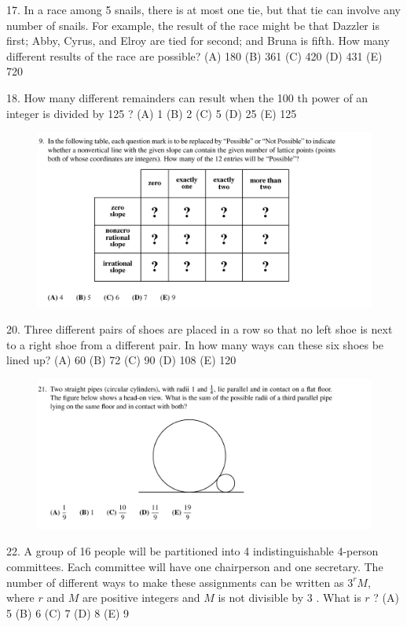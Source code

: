 \documentclass[12pt,a4paper]{book}
\theoremstyle{definition}
\begin{document}
17. In a race among 5 snails, there is at most one tie, but that tie can involve any number of snails. For example, the result of the race might be that Dazzler is first; Abby, Cyrus, and Elroy are tied for second; and Bruna is fifth. How many different results of the race are possible?
(A) 180
(B) 361
(C) 420
(D) 431
(E) 720

18. How many different remainders can result when the 100 th power of an integer is divided by 125 ?
(A) 1
(B) 2
(C) 5
(D) 25
(E) 125
\begin{figure}[H]
    \includegraphics[height=0.3\textheight]{19.png}
\end{figure}
20. Three different pairs of shoes are placed in a row so that no left shoe is next to a right shoe from a different pair. In how many ways can these six shoes be lined up?
(A) 60
(B) 72
(C) 90
(D) 108
(E) 120
\begin{figure}[H]
    \includegraphics[height=0.3\textheight]{21.png}
\end{figure}

22. A group of 16 people will be partitioned into 4 indistinguishable 4-person committees. Each committee will have one chairperson and one secretary. The number of different ways to make these assignments can be written as $3^r M$, where $r$ and $M$ are positive integers and $M$ is not divisible by 3 . What is $r$ ?
(A) 5
(B) 6
(C) 7
(D) 8
(E) 9
\end{document}
